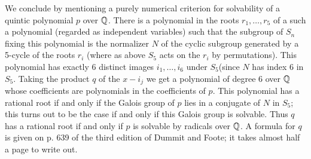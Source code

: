 We conclude by mentioning a purely numerical criterion for solvability of a quintic polynomial $p$ over $\Bbb Q$.  There is a polynomial in the roots $r_1,\ldots,r_5$ of a such a polynomial (regarded as independent variables) such that the subgroup of $S_n$ fixing this polynomial is the normalizer $N$ of the cyclic subgroup generated by a 5-cycle of the roots $r_i$ (where as above $S_5$ acts on the $r_i$ by permutations).  This polynomial has exactly 6 distinct images $i_1,\ldots,i_6$ under $S_5$(since $N$ has index 6 in $S_5$.  Taking the product $q$ of the $x-i_j$ we get a polynomial of degree 6 over $\Bbb Q$ whose coefficients are polynomials in the coefficients of $p$.  This polynomial has a rational root if and only if the Galois group of $p$ lies in a conjugate of $N$ in $S_5$; this turns out to be the case if and only if this Galois group is solvable.  Thus $q$ has a rational root if and only if $p$ is solvable by radicals over $\Bbb Q$.  A formula for $q$ is given on
p. 639 of the third edition of Dummit and Foote; it takes almost half a page to write out.